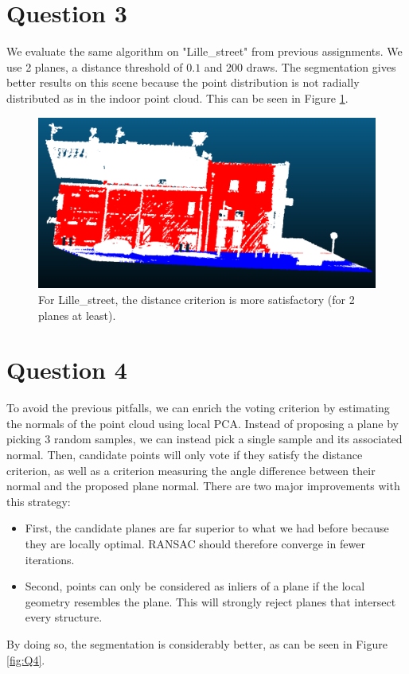 \documentclass[a4paper]{article}
\begin{document}
\section*{Question 3}

We evaluate the same algorithm on "Lille\_street" from previous assignments.
We use 2 planes, a distance threshold of $0.1$ and 200 draws.
The segmentation gives better results on this scene because the point distribution is not radially distributed as in the indoor point cloud. This can be seen in Figure \ref{fig:Q3}.

\begin{figure}[ht]
    \centering
    \includegraphics[width=0.3\linewidth]{figures/Q3.png}
    \caption{For Lille\_street, the distance criterion is more satisfactory (for 2 planes at least).}
    \label{fig:Q3}
\end{figure}

\section*{Question 4}

To avoid the previous pitfalls, we can enrich the voting criterion by estimating the normals of the point cloud using local PCA. Instead of proposing
a plane by picking 3 random samples, we can instead pick a single sample and its associated normal. Then, candidate points will only vote if they satisfy the distance criterion, as well
as a criterion measuring the angle difference between their normal and the proposed plane normal.
There are two major improvements with this strategy:
\begin{itemize}
    \item First, the candidate planes are far superior to what we had before because they are locally optimal. RANSAC should therefore converge in fewer iterations.
    \item Second, points can only be considered as inliers of a plane if the local geometry resembles the plane. This will strongly reject planes that intersect every structure.
\end{itemize}

By doing so, the segmentation is considerably better, as can be seen in Figure \ref{fig:Q4}.
\end{document}

